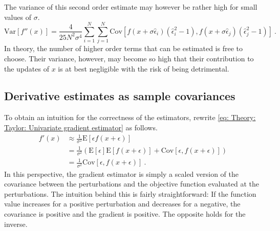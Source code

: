 The variance of this second order estimate may however be rather high for small values of $\sigma$.
\begin{equation}
    \text{Var}\left[f''(x)\right] = \frac{4}{25N^2\sigma^4} \sum_{i=1}^N\sum_{j=1}^N \text{Cov}\left[f(x+\sigma\hat{\epsilon}_i)\left(\hat{\epsilon}_i^2 - 1\right), f(x+\sigma\hat{\epsilon}_j)\left(\hat{\epsilon}_j^2 - 1\right)\right] \ .
\end{equation}
In theory, the number of higher order terms that can be estimated is free to choose. Their variance, however, may become so high that their contribution to the updates of $x$ is at best negligible with the risk of being detrimental.


\subsection{Derivative estimates as sample covariances}\label{sec: Theory: Taylor expansion interpretation of derivatives as covariances}
To obtain an intuition for the correctness of the estimators, rewrite \eqref{eq: Theory: Taylor: Univariate gradient estimator} as follows.
\begin{align*}
    f'(x)
    &\approx \frac{1}{\sigma^2}\text{E}\left[\epsilon f(x+\epsilon)\right]\\
    &= \frac{1}{\sigma^2} \left(\text{E}\left[\epsilon\right]\text{E}\left[f(x+\epsilon)\right] + \text{Cov}\left[\epsilon, f(x+\epsilon)\right]\right)\\
    &= \frac{1}{\sigma^2}\text{Cov}\left[\epsilon, f(x+\epsilon)\right] \ .
\end{align*}
\newcommand{\appropto}{\mathrel{\vcenter{
  \offinterlineskip\halign{\hfil$##$\cr
    \propto\cr\noalign{\kern2pt}\sim\cr\noalign{\kern-2pt}}}}}
In this perspective, the gradient estimator is simply a scaled version of the covariance between the perturbations and the objective function evaluated at the perturbations. The intuition behind this is fairly straightforward: If the function value increases for a positive perturbation and decreases for a negative, the covariance is positive and the gradient is positive. The opposite holds for the inverse.
